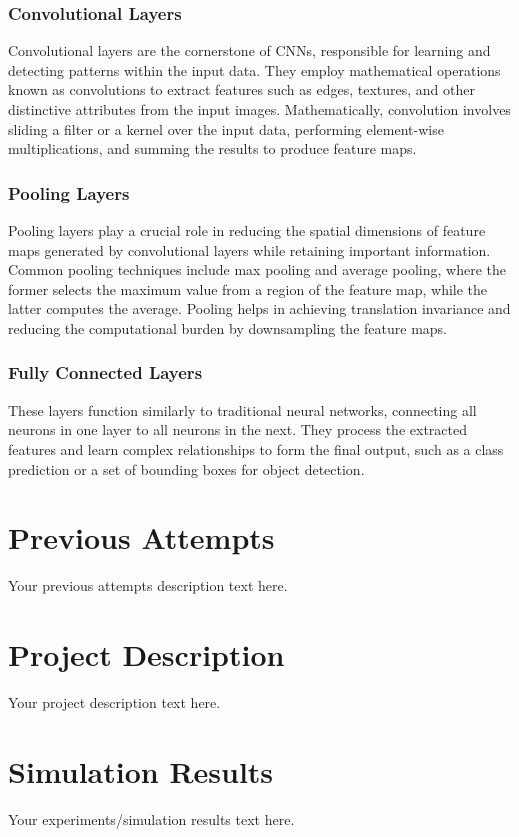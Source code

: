 \documentclass{article}
\begin{document}
\subsubsection{Convolutional Layers}
Convolutional layers are the cornerstone of CNNs, responsible for learning and detecting patterns within the input data. They employ mathematical operations known as convolutions to extract features such as edges, textures, and other distinctive attributes from the input images. Mathematically, convolution involves sliding a filter or a kernel over the input data, performing element-wise multiplications, and summing the results to produce feature maps.

\subsubsection{Pooling Layers}
Pooling layers play a crucial role in reducing the spatial dimensions of feature maps generated by convolutional layers while retaining important information. Common pooling techniques include max pooling and average pooling, where the former selects the maximum value from a region of the feature map, while the latter computes the average. Pooling helps in achieving translation invariance and reducing the computational burden by downsampling the feature maps.

\subsubsection{Fully Connected Layers}
These layers function similarly to traditional neural networks, connecting all neurons in one layer to all neurons in the next. They process the extracted features and learn complex relationships to form the final output, such as a class prediction or a set of bounding boxes for object detection.


\section{Previous Attempts}
Your previous attempts description text here.

\section{Project Description}
Your project description text here.

\section{Simulation Results}
Your experiments/simulation results text here.
\end{document}
